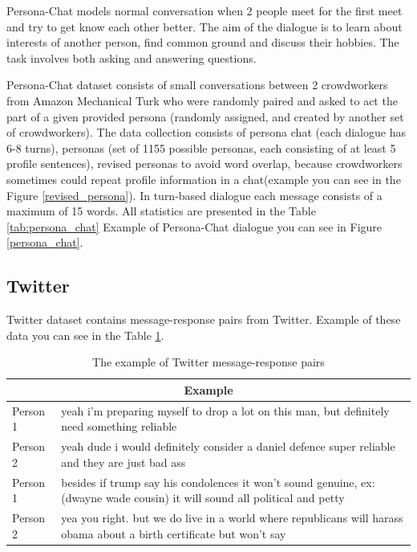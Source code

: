 Persona-Chat models normal conversation when 2 people meet for the first meet and try to get know each other better. The aim of the dialogue is to learn about interests of another person, find common ground and discuss their hobbies. The task involves both asking and answering questions. 

Persona-Chat dataset consists of small conversations between 2 crowdworkers from Amazon Mechanical Turk who were randomly paired and asked to act the part of a given provided persona (randomly assigned, and created by another set of crowdworkers). The data collection consists of persona chat (each dialogue has 6-8 turns), personas (set of 1155 possible personas, each consisting of at least 5 profile sentences), revised personas to avoid word overlap, because crowdworkers sometimes could repeat profile information in a chat(example you can see in the Figure \ref{revised_persona}). In turn-based dialogue each message consists of a maximum of 15 words. All statistics are presented in the Table \ref{tab:persona_chat} Example of Persona-Chat dialogue you can see in Figure \ref{persona_chat}. 


\subsection{Twitter}
Twitter dataset contains message-response pairs from Twitter. Example of these data you can see in the Table \ref{tab:twitter_chat}. 

\begin{table}[t]
\centering
 \begin{tabular}{|p{2cm}|p{8cm}|} 
 \hline
 \multicolumn{2}{|c|}{Example} \\
 \hline
 Person 1 & yeah i'm preparing myself to drop a lot on this man, but definitely need something reliable \\ 
 \hline
 Person 2 & yeah dude i would definitely consider a daniel defence super reliable and they are just bad ass \\
 \hline
 Person 1 & besides if trump say his condolences it won't sound genuine, ex: (dwayne wade cousin) it will sound all political and petty \\
 \hline
 Person 2 & yea you right. but we do live in a world where republicans will harass obama about a birth certificate but won't say \\
 \hline
 \end{tabular}
 \caption{The example of Twitter message-response pairs}
\label{tab:twitter_chat}
\end{table}

